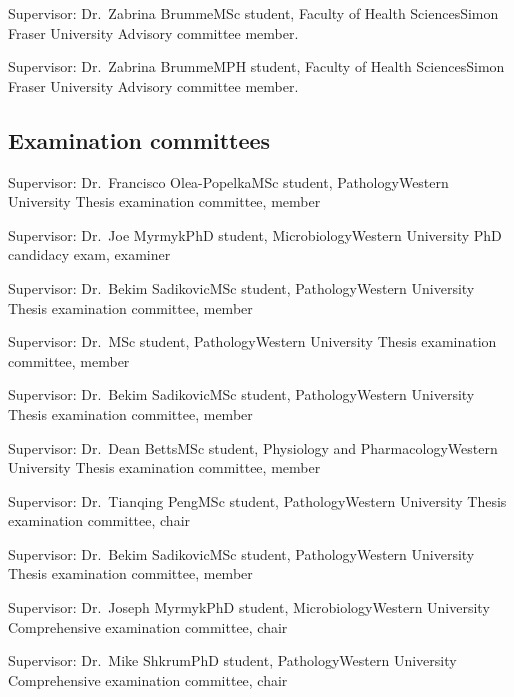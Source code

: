 {Supervisor: Dr.~Zabrina Brumme}{MSc student, Faculty of Health Sciences}{Simon Fraser University}
{Advisory committee member.}

{Supervisor: Dr.~Zabrina Brumme}{MPH student, Faculty of Health Sciences}{Simon Fraser University}
{Advisory committee member.}



\subsection {Examination committees} 

{Supervisor: Dr.~Francisco Olea-Popelka}{MSc student, Pathology}{Western University}
{Thesis examination committee, member}

{Supervisor: Dr.~Joe Myrmyk}{PhD student, Microbiology}{Western University}
{PhD candidacy exam, examiner}


{Supervisor: Dr.~Bekim Sadikovic}{MSc student, Pathology}{Western University}
{Thesis examination committee, member}

{Supervisor: Dr.~}{MSc student, Pathology}{Western University}
{Thesis examination committee, member}


{Supervisor: Dr.~Bekim Sadikovic}{MSc student, Pathology}{Western University}
{Thesis examination committee, member}

{Supervisor: Dr.~Dean Betts}{MSc student, Physiology and Pharmacology}{Western University}
{Thesis examination committee, member}


{Supervisor: Dr.~Tianqing Peng}{MSc student, Pathology}{Western University}
{Thesis examination committee, chair}


{Supervisor: Dr.~Bekim Sadikovic}{MSc student, Pathology}{Western University}
{Thesis examination committee, member}


{Supervisor: Dr.~Joseph Myrmyk}{PhD student, Microbiology}{Western University}
{Comprehensive examination committee, chair}

{Supervisor: Dr.~Mike Shkrum}{PhD student, Pathology}{Western University}
{Comprehensive examination committee, chair}

